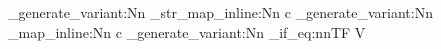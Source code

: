 %

%
%
%
%
%


\usepackage{expl3}
\usepackage{xparse}
\usepackage{forloop}
\usepackage{siunitx}


\ExplSyntaxOn
\cs_generate_variant:Nn \ior_str_map_inline:Nn { c } 
\cs_generate_variant:Nn \ior_map_inline:Nn { c }
\cs_generate_variant:Nn \tl_if_eq:nnTF { V }

\newcommand{\loadvariables}[2]{
}

